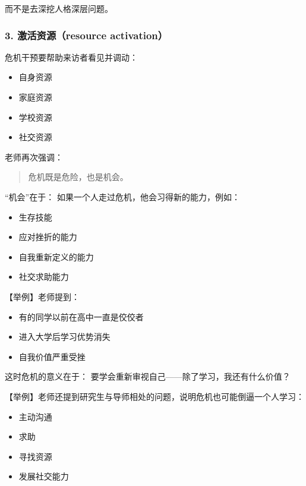 \documentclass[
  chinese,
  9pt,
  a4paper,
]{ctexart}
\providecommand{\tightlist}{%
  \setlength{\itemsep}{0pt}\setlength{\parskip}{0pt}}
\begin{document}
而不是去深挖人格深层问题。

\subsubsection{3. 激活资源（resource
activation）}\label{ux6fc0ux6d3bux8d44ux6e90resource-activation}

危机干预要帮助来访者看见并调动：

\begin{itemize}
\tightlist
\item
  自身资源
\item
  家庭资源
\item
  学校资源
\item
  社交资源
\end{itemize}

老师再次强调：

\begin{quote}
危机既是危险，也是机会。
\end{quote}

``机会''在于： 如果一个人走过危机，他会习得新的能力，例如：

\begin{itemize}
\tightlist
\item
  生存技能
\item
  应对挫折的能力
\item
  自我重新定义的能力
\item
  社交求助能力
\end{itemize}

【举例】老师提到：

\begin{itemize}
\tightlist
\item
  有的同学以前在高中一直是佼佼者
\item
  进入大学后学习优势消失
\item
  自我价值严重受挫
\end{itemize}

这时危机的意义在于： 要学会重新审视自己------除了学习，我还有什么价值？

【举例】老师还提到研究生与导师相处的问题，说明危机也可能倒逼一个人学习：

\begin{itemize}
\tightlist
\item
  主动沟通
\item
  求助
\item
  寻找资源
\item
  发展社交能力
\end{itemize}
\end{document}
